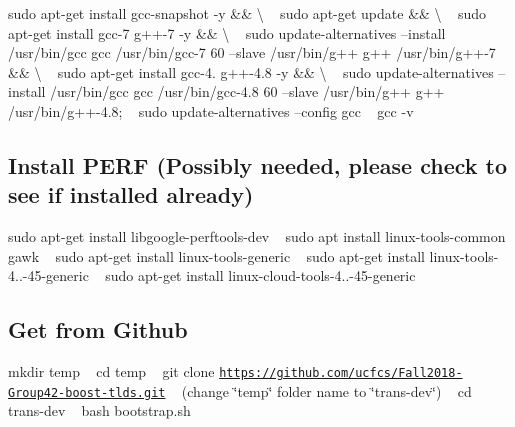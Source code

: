 sudo apt-\/get install gcc-\/snapshot -\/y \&\& \textbackslash{} ~\newline
 sudo apt-\/get update \&\& \textbackslash{} ~\newline
 sudo apt-\/get install gcc-\/7 g++-\/7 -\/y \&\& \textbackslash{} ~\newline
 sudo update-\/alternatives --install /usr/bin/gcc gcc /usr/bin/gcc-\/7 60 --slave /usr/bin/g++ g++ /usr/bin/g++-\/7 \&\& \textbackslash{} ~\newline
 sudo apt-\/get install gcc-\/4. g++-\/4.8 -\/y \&\& \textbackslash{} ~\newline
 sudo update-\/alternatives --install /usr/bin/gcc gcc /usr/bin/gcc-\/4.8 60 --slave /usr/bin/g++ g++ /usr/bin/g++-\/4.8; ~\newline
 sudo update-\/alternatives --config gcc ~\newline
 gcc -\/v ~\newline
\hypertarget{index_step3}{}\subsection{Install P\+E\+R\+F (\+Possibly needed, please check to see if installed already)}\label{index_step3}
sudo apt-\/get install libgoogle-\/perftools-\/dev ~\newline
 sudo apt install linux-\/tools-\/common gawk ~\newline
 sudo apt-\/get install linux-\/tools-\/generic ~\newline
 sudo apt-\/get install linux-\/tools-\/4..-\/45-\/generic ~\newline
 sudo apt-\/get install linux-\/cloud-\/tools-\/4..-\/45-\/generic ~\newline
\hypertarget{index_step4}{}\subsection{Get from Github}\label{index_step4}
mkdir temp ~\newline
 cd temp ~\newline
 git clone \href{https://github.com/ucfcs/Fall2018-Group42-boost-tlds.git}{\tt https\+://github.\+com/ucfcs/\+Fall2018-\/\+Group42-\/boost-\/tlds.\+git} ~\newline
 (change \char`\"{}temp\char`\"{} folder name to \char`\"{}trans-\/dev\char`\"{}) ~\newline
 cd trans-\/dev ~\newline
 bash bootstrap.\+sh ~\newline
